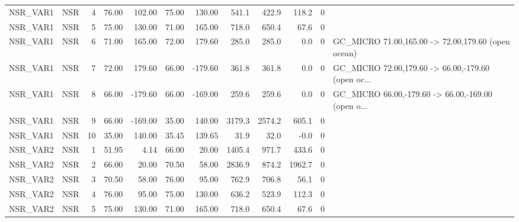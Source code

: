 \begin{tabular}{llrrrrrrrrrl}
 NSR\_VAR1 &      NSR &        4 &     76.00 &    102.00 &   75.00 &  130.00 &   541.1 &  422.9 &            118.2 &           0 &                                                    \\
 NSR\_VAR1 &      NSR &        5 &     75.00 &    130.00 &   71.00 &  165.00 &   718.0 &  650.4 &             67.6 &           0 &                                                    \\
 NSR\_VAR1 &      NSR &        6 &     71.00 &    165.00 &   72.00 &  179.60 &   285.0 &  285.0 &              0.0 &           0 & GC\_MICRO 71.00,165.00 -> 72.00,179.60 (open ocean) \\
 NSR\_VAR1 &      NSR &        7 &     72.00 &    179.60 &   66.00 & -179.60 &   361.8 &  361.8 &              0.0 &           0 & GC\_MICRO 72.00,179.60 -> 66.00,-179.60 (open oc... \\
 NSR\_VAR1 &      NSR &        8 &     66.00 &   -179.60 &   66.00 & -169.00 &   259.6 &  259.6 &              0.0 &           0 & GC\_MICRO 66.00,-179.60 -> 66.00,-169.00 (open o... \\
 NSR\_VAR1 &      NSR &        9 &     66.00 &   -169.00 &   35.00 &  140.00 &  3179.3 & 2574.2 &            605.1 &           0 &                                                    \\
 NSR\_VAR1 &      NSR &       10 &     35.00 &    140.00 &   35.45 &  139.65 &    31.9 &   32.0 &             -0.0 &           0 &                                                    \\
 NSR\_VAR2 &      NSR &        1 &     51.95 &      4.14 &   66.00 &   20.00 &  1405.4 &  971.7 &            433.6 &           0 &                                                    \\
 NSR\_VAR2 &      NSR &        2 &     66.00 &     20.00 &   70.50 &   58.00 &  2836.9 &  874.2 &           1962.7 &           0 &                                                    \\
 NSR\_VAR2 &      NSR &        3 &     70.50 &     58.00 &   76.00 &   95.00 &   762.9 &  706.8 &             56.1 &           0 &                                                    \\
 NSR\_VAR2 &      NSR &        4 &     76.00 &     95.00 &   75.00 &  130.00 &   636.2 &  523.9 &            112.3 &           0 &                                                    \\
 NSR\_VAR2 &      NSR &        5 &     75.00 &    130.00 &   71.00 &  165.00 &   718.0 &  650.4 &             67.6 &           0 &                                                    \\

\end{tabular}
